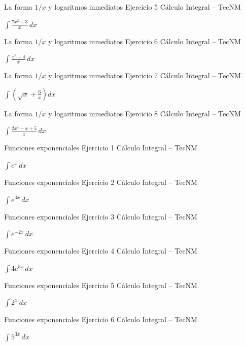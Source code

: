\documentclass[aspectratio=169,12pt]{beamer}
\newcommand{\ejercicio}[1]{%
  \begin{center}
  \vfill
  {\fontsize{24}{30}\selectfont #1}
  \vfill
  \end{center}
}
\begin{document}
\begin{frame}{La forma $1/x$ y logaritmos inmediatos}
\small Ejercicio 5 \hfill Cálculo Integral -- TecNM
\ejercicio{$\displaystyle \int\frac{7x^2+3}{x}\,dx$}
\end{frame}

\begin{frame}{La forma $1/x$ y logaritmos inmediatos}
\small Ejercicio 6 \hfill Cálculo Integral -- TecNM
\ejercicio{$\displaystyle \int\frac{x^3-4}{x}\,dx$}
\end{frame}

\begin{frame}{La forma $1/x$ y logaritmos inmediatos}
\small Ejercicio 7 \hfill Cálculo Integral -- TecNM
\ejercicio{$\displaystyle \int\left(\sqrt{x}+\frac{6}{x}\right)dx$}
\end{frame}

\begin{frame}{La forma $1/x$ y logaritmos inmediatos}
\small Ejercicio 8 \hfill Cálculo Integral -- TecNM
\ejercicio{$\displaystyle \int\frac{2x^4-x+5}{x}\,dx$}
\end{frame}

\begin{frame}{Funciones exponenciales}
\small Ejercicio 1 \hfill Cálculo Integral -- TecNM
\ejercicio{$\displaystyle \int e^x\,dx$}
\end{frame}

\begin{frame}{Funciones exponenciales}
\small Ejercicio 2 \hfill Cálculo Integral -- TecNM
\ejercicio{$\displaystyle \int e^{3x}\,dx$}
\end{frame}

\begin{frame}{Funciones exponenciales}
\small Ejercicio 3 \hfill Cálculo Integral -- TecNM
\ejercicio{$\displaystyle \int e^{-2x}\,dx$}
\end{frame}

\begin{frame}{Funciones exponenciales}
\small Ejercicio 4 \hfill Cálculo Integral -- TecNM
\ejercicio{$\displaystyle \int 4e^{5x}\,dx$}
\end{frame}

\begin{frame}{Funciones exponenciales}
\small Ejercicio 5 \hfill Cálculo Integral -- TecNM
\ejercicio{$\displaystyle \int 2^x\,dx$}
\end{frame}

\begin{frame}{Funciones exponenciales}
\small Ejercicio 6 \hfill Cálculo Integral -- TecNM
\ejercicio{$\displaystyle \int 5^{3x}\,dx$}
\end{frame}
\end{document}
